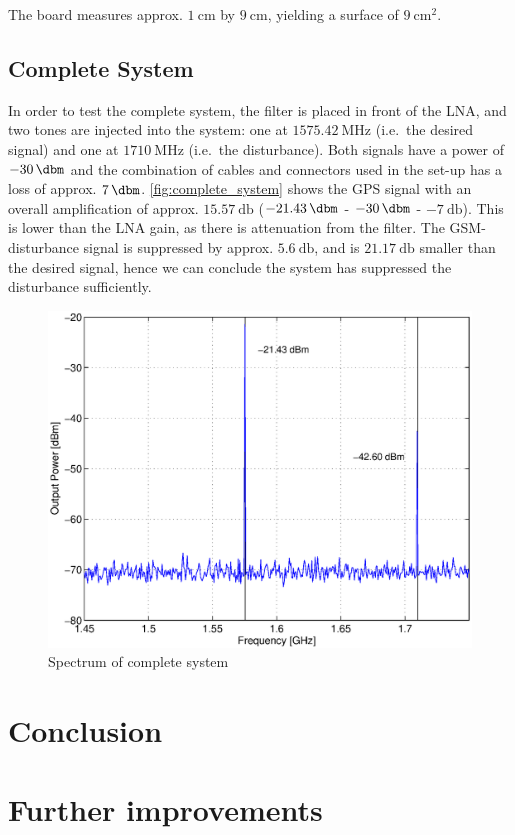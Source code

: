 \documentclass[a4paper]{article}        %
\begin{document}
  The board measures approx. $\SI{1}{\centi\meter}$ by $\SI{9}{\centi\meter}$, yielding a surface of $\SI{9}{\centi\meter\squared}$.
  \subsection{Complete System}
  In order to test the complete system, the filter is placed in front of the LNA, and two tones are injected into the system: one at $\SI{1575.42}{\mega\hertz}$ (i.e.\ the desired signal) and one at $\SI{1710}{\mega\hertz}$ (i.e.\ the disturbance).  
  Both signals have a power of $\SI{-30}{\dbm}$ and the combination of cables and connectors used in the set-up has a loss of approx. $\SI{7}{\dbm}$.
  \autoref{fig:complete_system} shows the GPS signal with an overall amplification of approx. $\SI{15.57}{\decibel}$ ($\SI{-21.43}{\dbm}$ - $\SI{-30}{\dbm}$ - $\SI{-7}{\decibel}$). This is lower than the LNA gain, as there is attenuation from the filter.
  The GSM-disturbance signal is suppressed by approx. $\SI{5.6}{\decibel}$, and is $\SI{21.17}{\decibel}$ smaller than the desired signal, hence we can conclude the system has suppressed the disturbance sufficiently.
  \begin{figure}[H]
    \centering
    \includegraphics[width=\textwidth]{fig/Filter/spectrum_system.eps}
    \caption{Spectrum of complete system}
    \label{fig:complete_system}
  \end{figure}
\section{Conclusion}

\section{Further improvements}



\end{document}
